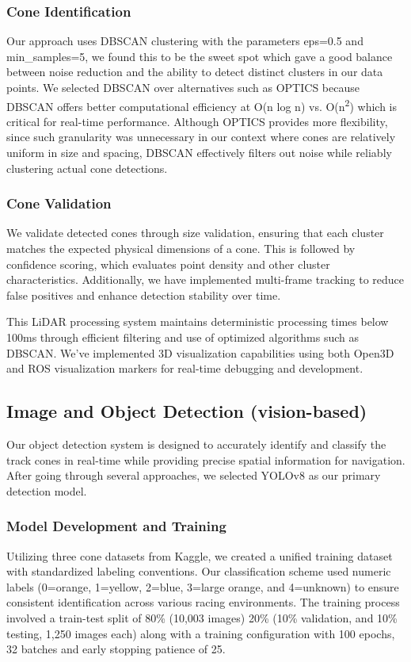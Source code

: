\documentclass[conference]{IEEEtran}
\begin{document}
\subsubsection{Cone Identification}
Our approach uses DBSCAN clustering with the parameters eps=0.5 and min\_samples=5, we found this to be the sweet spot which gave a good balance between noise reduction and the ability to detect distinct clusters in our data points. We selected DBSCAN over alternatives such as OPTICS because DBSCAN offers better computational efficiency at O(n log n) vs. O(n\textsuperscript{2}) which is critical for real-time performance. Although OPTICS provides more flexibility, since such granularity was unnecessary in our context where cones are relatively uniform in size and spacing, DBSCAN effectively filters out noise while reliably clustering actual cone detections.

\vspace{0.2em}
\subsubsection{Cone Validation}
We validate detected cones through size validation, ensuring that each cluster matches the expected physical dimensions of a cone. This is followed by confidence scoring, which evaluates point density and other cluster characteristics. Additionally, we have implemented multi-frame tracking to reduce false positives and enhance detection stability over time.

\vspace{0.4em}
This LiDAR processing system maintains deterministic processing times below 100ms through efficient filtering and use of optimized algorithms such as DBSCAN. We've implemented 3D visualization capabilities using both Open3D and ROS visualization markers for real-time debugging and development.

\subsection{Image and Object Detection (vision-based)}
Our object detection system is designed to accurately identify and classify the track cones in real-time while providing precise spatial information for navigation. After going through several approaches, we selected YOLOv8 as our primary detection model.

\subsubsection{Model Development and Training}
Utilizing three cone datasets from Kaggle, we created a unified training dataset with standardized labeling conventions. Our classification scheme used numeric labels (0=orange, 1=yellow, 2=blue, 3=large orange, and 4=unknown) to ensure consistent identification across various racing environments. The training process involved a train-test split of 80\% (10,003 images) 20\% (10\% validation, and 10\% testing, 1,250 images each) along with a training configuration with 100 epochs, 32 batches and early stopping patience of 25. 
\end{document}
